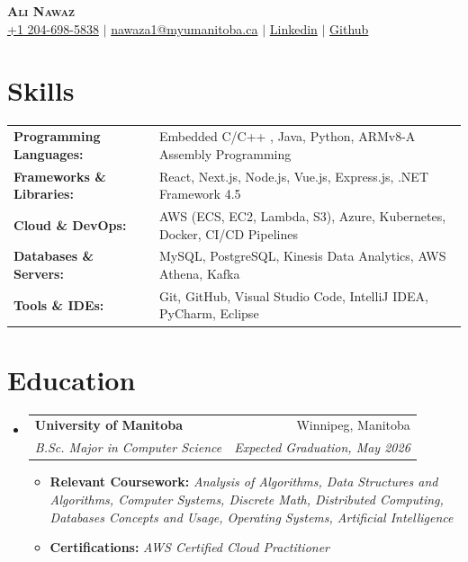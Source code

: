 \documentclass[letterpaper,11pt]{article}
\makeatletter
\newcommand{\resumeItem}[1]{
  \item\small{
    {#1 \vspace{-2pt}}
  }
}
\newcommand{\resumeSubheading}[4]{
  \vspace{-2pt}\item
    \begin{tabular*}{0.97\textwidth}[t]{l@{\extracolsep{\fill}}r}
      \textbf{#1} & #2 \\
      \textit{\small#3} & \textit{\small #4} \\
    \end{tabular*}\vspace{-4pt} %
}
\newcommand{\resumeSubHeadingListStart}{\begin{itemize}[leftmargin=0.15in, label={}]}
\newcommand{\resumeSubHeadingListEnd}{\end{itemize}}
\newcommand{\resumeItemListStart}{\begin{itemize}}
\newcommand{\resumeItemListEnd}{\end{itemize}\vspace{-6pt}} %
\makeatother
\begin{document}
\begin{center}
    \textbf{\Huge \scshape Ali Nawaz} \\ \vspace{1pt}
    \small 
     \href{tel:+12046985838}{+1 204-698-5838} $|$ 
     \href{mailto:nawaza1@myumanitoba.ca}{nawaza1@myumanitoba.ca} $|$ 
     \href{https://www.linkedin.com/in/ali-nawaz-385a0b172/}{Linkedin} $|$
     \href{https://github.com/Ali90922}{Github}
\end{center}

\section{Skills}

\begin{tabularx}{\textwidth}{>{\bfseries}l X}
Programming Languages: & Embedded C/C++ , Java, Python, ARMv8-A Assembly Programming \\
Frameworks \& Libraries: & React, Next.js, Node.js, Vue.js, Express.js, .NET Framework 4.5 \\
Cloud \& DevOps: & AWS (ECS, EC2, Lambda, S3), Azure, Kubernetes, Docker, CI/CD Pipelines \\
Databases \& Servers: & MySQL, PostgreSQL, Kinesis Data Analytics, AWS Athena, Kafka \\
Tools \& IDEs: & Git, GitHub, Visual Studio Code, IntelliJ IDEA, PyCharm, Eclipse \\
\end{tabularx}

\vspace{-7pt}

\section{Education}
\resumeSubHeadingListStart
    \resumeSubheading
      {University of Manitoba}{Winnipeg, Manitoba}
      {B.Sc. Major in Computer Science}{Expected Graduation, May 2026}
      \resumeItemListStart
        \resumeItem{\textbf{Relevant Coursework:} \textit{Analysis of Algorithms, Data Structures and Algorithms, Computer Systems, Discrete Math, Distributed Computing, Databases Concepts and Usage, Operating Systems, Artificial Intelligence }}
        \resumeItem{\textbf{Certifications:} \textit{AWS Certified Cloud Practitioner}}
      \resumeItemListEnd
\resumeSubHeadingListEnd
\end{document}
